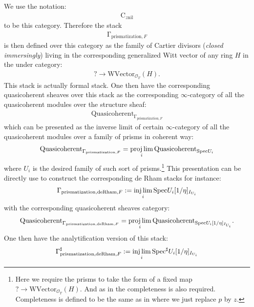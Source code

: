 \documentclass[12pt]{article}
\theoremstyle{definition}
\begin{document}
We use the notation:
\begin{align}
\mathrm{C}_{z\mathrm{nil}} 
\end{align}
to be this category. Therefore the stack
\begin{align}
\mathrm{\Gamma}_{\mathrm{prismatization},F}
\end{align} 
is then defined over this category as the family of Cartier divisors (\textit{closed immersingly}) living in the corresponding generalized Witt vector of any ring $H$ in the under category:
\begin{align}
?\rightarrow \mathrm{WVector}_{\mathcal{O}_T}(H).
\end{align}
This stack is actually formal stack. One then have the corresponding quasicoherent sheaves over this stack as the corresponding $\infty$-category of all the quasicoherent modules over the structure sheaf:
\begin{align}
\mathrm{Quasicoherent}_{\mathrm{\Gamma}_{\mathrm{prismatization},F}}
\end{align}
which can be presented as the inverse limit of certain $\infty$-category of all the quasicoherent modules over a family of prisms in coherent way:
\begin{align}
\mathrm{Quasicoherent}_{\mathrm{\Gamma}_{\mathrm{prismatization},F}}=\projlim_i \mathrm{Quasicoherent}_{\mathrm{Spec}U_i}
\end{align}
where $U_i$ is the desired family of such sort of prisms.\footnote{Here we require the prisms to take the form of a fixed map $?\rightarrow \mathrm{WVector}_{\mathcal{O}_T}(H)$. And as in \cite{BSI} the completeness is also required. Completeness is defined to be the same as in \cite{BSI} where we just replace $p$ by $z$.} This presentation can be directly use to construct the corresponding de Rham stacks for instance:
\begin{align}
\mathrm{\Gamma}_{\mathrm{prismatization},\mathrm{deRham},F}:=\injlim_i \mathrm{Spec}U_i[1/\eta]_{I_{U_i}}
\end{align}
with the corresponding quasicoherent sheaves category:
\begin{align}
\mathrm{Quasicoherent}_{\mathrm{\Gamma}_{\mathrm{prismatization},\mathrm{deRham},F}}=\projlim_i \mathrm{Quasicoherent}_{\mathrm{Spec}U_i[1/\eta]_{I_{U_i}}}.
\end{align}
One then have the analytification version of this stack:
\begin{align}
\mathrm{\Gamma}^\sharp_{\mathrm{prismatization},\mathrm{deRham},F}:=\injlim_i \mathrm{Spec}^\sharp U_i[1/\eta]_{I_{U_i}}
\end{align}
\end{document}
